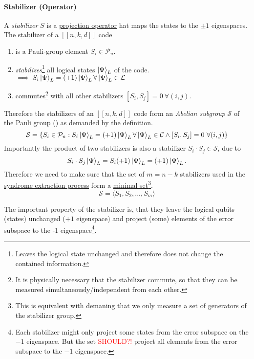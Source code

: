 \paragraph{Stabilizer (Operator)}
A \textit{stabilizer} 
$S$ is a 
\hyperref[sec:basic.math.projection_operator]{projection operator} 
hat maps the states to the $\pm 1$ eigenspaces. 
The stabilizer of a $[[n,k,d]]$ code 
\begin{enumerate}
    \item is a Pauli-group element $S_i \in \mathcal{P}_n$.
    \item \textit{stabilizes}\footnote{
        Leaves the logical state unchanged and therefore does not change the contained information.
        } all logical states $\ket{\Psi}_L$ of the code. \\
    $\implies S_i \ket{\Psi}_L = (+1) \ket{\Psi}_L \forall \ket{\Psi}_L \in \mathcal{L} $ 
    \item commutes\footnote{
It is physically necessary that the stabilizer commute, so that they can be measured simultaneously/independent from each other. 
    } with all other stabilizers $[S_i,S_j]=0 \ \forall (i,j)$.
\end{enumerate}
Therefore the stabilizers of an $[[n,k,d]]$ code form an \textit{Abelian subgroup} $\mathcal{S}$ of the Pauli group (\cite{QECintro}) as demanded by the definition.
\begin{equation}
    \mathcal{S} = \{ S_i \in \mathcal{P}_n : S_i \ket{\Psi}_L = (+1) \ket{\Psi}_L \forall \ket{\Psi}_L\in \mathcal{C} \land [S_i,S_j]=0 \ \forall(i,j)\}
\end{equation}
Importantly the product of two stabilizers is also a stabilizer $S_i \cdot S_j \in \mathcal{S}$, due to
\begin{equation}
    S_i \cdot S_j  \ket{\Psi}_L = S_i (+1) \ket{\Psi}_L = (+1) \ket{\Psi}_L.
\end{equation}
Therefore we need to make sure that the set of $m=n-k$ stabilizers used in the \hyperref[sec:basic.qc.syndrome_extraction_process]{syndrome extraction process}
form a \hyperref[sec:basic.math.minimal_set]{minimal set}\footnote{
    This is equivalent with demaning that we only measure a set of generators of the stabilizer group.
}. 
\begin{equation}
    \mathcal{S}= \langle S_1, S_2, ..., S_m\rangle
\end{equation}

The important property of the stabilizer is, that they leave the logical qubits (states) unchanged ($+1$ eigenspace) 
and project (some) elements of the error subspace to the -1 eigenspace\footnote{
    Each stabilizer might only project some states from the error subspace on the $-1$ eigenspace. 
    But the set \textcolor{red}{SHOULD?!} project all elements from the error subspace to the $-1$ eigenspace. 
}. \cite{QECintro}


